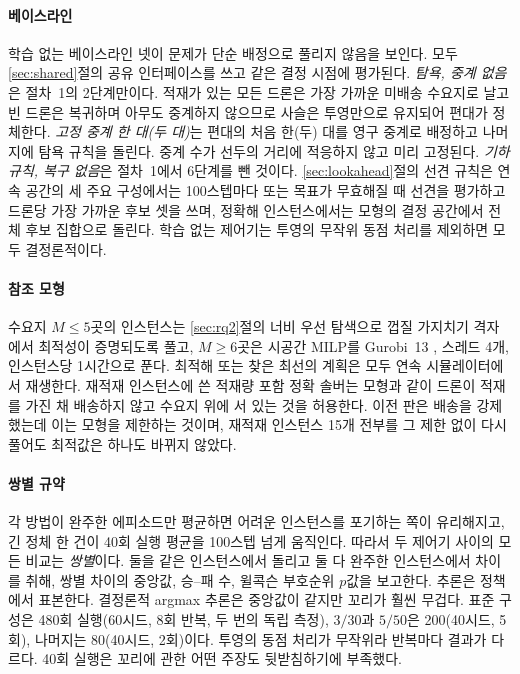\documentclass[final,5p,times,twocolumn]{elsarticle}
\begin{document}
\paragraph{베이스라인}
학습 없는 베이스라인 넷이 문제가 단순 배정으로 풀리지 않음을 보인다. 모두 \ref{sec:shared}절의
공유 인터페이스를 쓰고 같은 결정 시점에 평가된다. \emph{탐욕, 중계 없음}은 절차~1의 2단계만이다.
적재가 있는 모든 드론은 가장 가까운 미배송 수요지로 날고 빈 드론은 복귀하며 아무도 중계하지
않으므로 사슬은 투영만으로 유지되어 편대가 정체한다. \emph{고정 중계 한 대(두 대)}는 편대의 처음
한(두) 대를 영구 중계로 배정하고 나머지에 탐욕 규칙을 돌린다. 중계 수가 선두의 거리에 적응하지
않고 미리 고정된다. \emph{기하 규칙, 복구 없음}은 절차~1에서 6단계를 뺀 것이다. \ref{sec:lookahead}절의 선견 규칙은
연속 공간의 세 주요 구성에서는 100스텝마다 또는 목표가 무효해질 때 선견을 평가하고 드론당 가장 가까운
후보 셋을 쓰며, 정확해 인스턴스에서는 모형의 결정 공간에서 전체 후보 집합으로 돌린다. 학습 없는
제어기는 투영의 무작위 동점 처리를 제외하면 모두 결정론적이다.

\paragraph{참조 모형}
수요지 $M \le 5$곳의 인스턴스는 \ref{sec:rq2}절의 너비 우선 탐색으로 껍질 가지치기 격자에서
최적성이 증명되도록 풀고, $M \ge 6$곳은 시공간 MILP를 Gurobi~13 \cite{gurobi}, 스레드 4개,
인스턴스당 1시간으로 푼다. 최적해 또는 찾은 최선의 계획은 모두 연속 시뮬레이터에서 재생한다. 재적재
인스턴스에 쓴 적재량 포함 정확 솔버는 모형과 같이 드론이 적재를 가진 채 배송하지 않고 수요지 위에 서
있는 것을 허용한다. 이전 판은 배송을 강제했는데 이는 모형을 제한하는 것이며, 재적재 인스턴스 15개
전부를 그 제한 없이 다시 풀어도 최적값은 하나도 바뀌지 않았다.

\paragraph{쌍별 규약}
각 방법이 완주한 에피소드만 평균하면 어려운 인스턴스를 포기하는 쪽이 유리해지고, 긴 정체 한 건이
40회 실행 평균을 100스텝 넘게 움직인다. 따라서 두 제어기 사이의 모든 비교는 \emph{쌍별}이다. 둘을
같은 인스턴스에서 돌리고 둘 다 완주한 인스턴스에서 차이를 취해, 쌍별 차이의 중앙값, 승--패 수,
윌콕슨 부호순위 $p$값을 보고한다. 추론은 정책에서 표본한다. 결정론적 argmax 추론은 중앙값이 같지만
꼬리가 훨씬 무겁다. 표준 구성은 480회 실행(60시드, 8회 반복, 두 번의 독립 측정), $3/30$과 $5/50$은
200(40시드, 5회), 나머지는 80(40시드, 2회)이다. 투영의 동점 처리가 무작위라 반복마다 결과가
다르다. 40회 실행은 꼬리에 관한 어떤 주장도 뒷받침하기에 부족했다.
\end{document}
